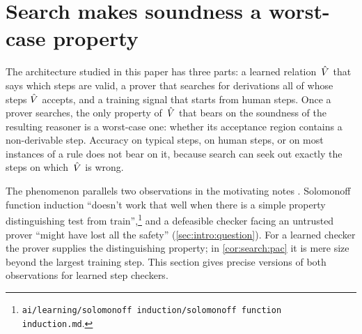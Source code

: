 \providecommand{\ACCEPT}{\textsf{ACCEPT}}
\providecommand{\Steps}{\mathrm{Steps}}

\section{Search makes soundness a worst-case property}\label{sec:search}

The architecture studied in this paper has three parts: a learned relation~$\hat V$ that says which steps are valid, a prover that searches for derivations all of whose steps $\hat V$ accepts, and a training signal that starts from human steps. Once a prover searches, the only property of~$\hat V$ that bears on the soundness of the resulting reasoner is a worst-case one: whether its acceptance region contains a non-derivable step. Accuracy on typical steps, on human steps, or on most instances of a rule does not bear on it, because search can seek out exactly the steps on which~$\hat V$ is wrong.

The phenomenon parallels two observations in the motivating notes \citep{hanni2026notes}. Solomonoff function induction ``doesn't work that well when there is a simple property distinguishing test from train'',\footnote{\texttt{ai/learning/solomonoff induction/solomonoff function induction.md}.} and a defeasible checker facing an untrusted prover ``might have lost all the safety'' (\cref{sec:intro:question}). For a learned checker the prover supplies the distinguishing property; in \cref{cor:search:pac} it is mere size beyond the largest training step. This section gives precise versions of both observations for learned step checkers.

